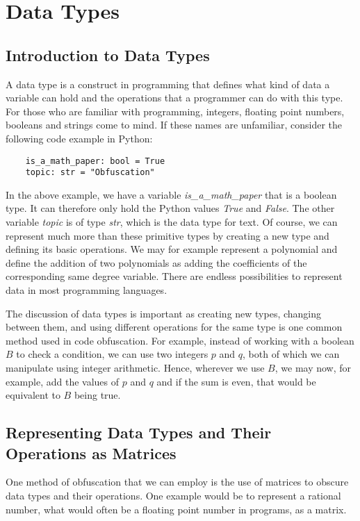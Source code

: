 \section{Data Types}
\subsection{Introduction to Data Types}
A data type is a construct in programming that defines what kind of data a
variable can hold and the operations that a programmer can do with this type.
For those who are familiar with programming, integers, floating point numbers,
booleans and strings come to mind. If these names are unfamiliar, consider the
following code example in Python:
\begin{verbatim}
    is_a_math_paper: bool = True
    topic: str = "Obfuscation"
\end{verbatim}
In the above example, we have a variable \textit{is\_a\_math\_paper} that is a
boolean type. It can therefore only hold the Python values \textit{True} and
\textit{False}. The other variable \textit{topic} is of type \textit{str},
which is the data
type for text. Of course, we can represent much more than
these primitive types by creating a new type and defining its basic
operations. We may for example represent a polynomial and define the addition
of two polynomials as adding the coefficients of the corresponding
same degree variable. There are endless possibilities to represent data in
most programming languages.

The discussion of data types is important as creating new types, changing
between them, and using different operations for the same type is one common
method used in code obfuscation. For example, instead of working with a boolean
$ B $ to check a condition, we can use two integers $ p $ and $ q $, both of
which we can manipulate using integer arithmetic. Hence, wherever we use $ B $,
we may now, for example, add the values of $ p $ and $ q $ and if the sum is
even, that would be equivalent to $ B $ being true.

\subsection{Representing Data Types and Their Operations as Matrices}
One method of obfuscation that we can employ is the use of matrices to obscure
data types and their operations. One example would be to represent a
rational number, what would often be a floating point number in programs, as a
matrix.

